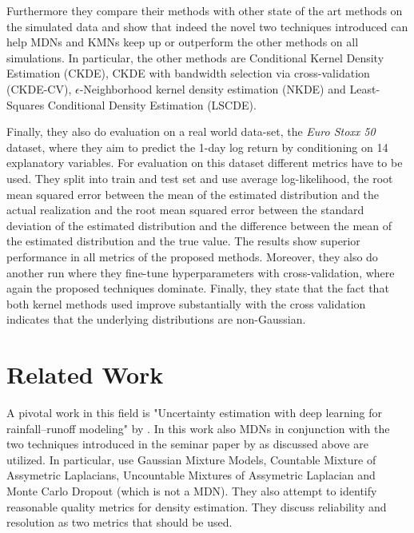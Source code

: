 \documentclass{article}
\begin{document}
Furthermore they compare their methods with other state of the art methods on the simulated data and show that indeed the novel two techniques introduced can help MDNs and KMNs keep up or outperform the other methods on all simulations. In particular, the other methods are Conditional Kernel Density Estimation (CKDE), CKDE with bandwidth selection via cross-validation (CKDE-CV), $\epsilon$-Neighborhood kernel density estimation (NKDE) and Least-Squares Conditional Density Estimation (LSCDE).

Finally, they also do evaluation on a real world data-set, the \textit{Euro Stoxx 50} dataset, where they aim to predict the 1-day log return by conditioning on 14 explanatory variables. For evaluation on this dataset different metrics have to be used. They split into train and test set and use average log-likelihood, the root mean squared error between the mean of the estimated distribution and the actual realization and the root mean squared error between the standard deviation of the estimated distribution and the difference between the mean of the estimated distribution and the true value. The results show superior performance in all metrics of the proposed methods. Moreover, they also do another run where they fine-tune hyperparameters with cross-validation, where again the proposed techniques dominate. Finally, they state that the fact that both kernel methods used improve substantially with the cross validation indicates that the underlying distributions are non-Gaussian.

\section{Related Work}

A pivotal work in this field is "Uncertainty estimation with deep learning for rainfall–runoff modeling" by \citep{klotz2021uncertainty}. In this work also MDNs in conjunction with the two techniques introduced in the seminar paper by \citep{rothfuss2019conditional} as discussed above are utilized. In particular, \citep{klotz2021uncertainty} use Gaussian Mixture Models, Countable Mixture of Assymetric Laplacians, Uncountable Mixtures of Assymetric Laplacian and Monte Carlo Dropout (which is not a MDN). They also attempt to identify reasonable quality metrics for density estimation. They discuss reliability and resolution as two metrics that should be used.
\end{document}
